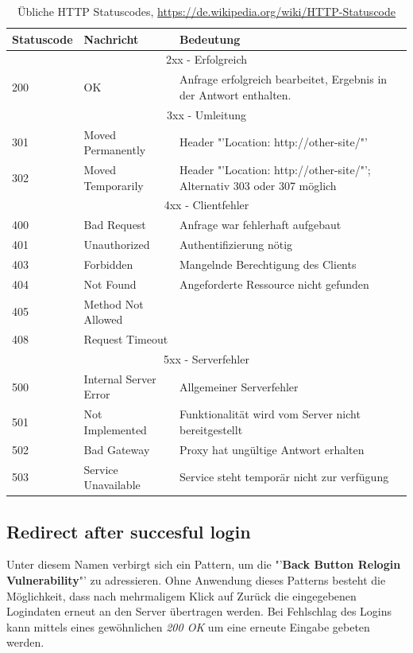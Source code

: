 \begin{table}[H]
	\begin{tabularx}{\textwidth}{l|p{100pt}|X}
		\textbf{Statuscode} & \textbf{Nachricht} & \textbf{Bedeutung}\\ \hline
		\multicolumn{3}{c}{2xx - Erfolgreich} \\ \hline
		200 & OK & Anfrage erfolgreich bearbeitet, Ergebnis in der Antwort enthalten. \\ \hline
		\multicolumn{3}{c}{3xx - Umleitung} \\ \hline
		301 & Moved Permanently & Header "'Location: http://other-site/"' \\ \hline
		302 & Moved Temporarily & Header "'Location: http://other-site/"'; Alternativ 303 oder 307 möglich \\ \hline
		\multicolumn{3}{c}{4xx - Clientfehler} \\ \hline
		400 & Bad Request & Anfrage war fehlerhaft aufgebaut \\ \hline
		401 & Unauthorized & Authentifizierung nötig \\ \hline
		403 & Forbidden & Mangelnde Berechtigung des Clients \\ \hline
		404 & Not Found & Angeforderte Ressource nicht gefunden \\ \hline
		405 & Method Not Allowed & \\ \hline
		408 & Request Timeout & \\ \hline
		\multicolumn{3}{c}{5xx - Serverfehler} \\ \hline
		500 & Internal Server Error & Allgemeiner Serverfehler \\ \hline
		501 & Not Implemented & Funktionalität wird vom Server nicht bereitgestellt \\ \hline
		502 & Bad Gateway & Proxy hat ungültige Antwort erhalten \\ \hline
		503 & Service Unavailable & Service steht temporär nicht zur verfügung \\ \hline
	\end{tabularx}
	\caption{Übliche HTTP Statuscodes, \url{https://de.wikipedia.org/wiki/HTTP-Statuscode}}
\end{table}

\subsection{Redirect after succesful login}
Unter diesem Namen verbirgt sich ein Pattern, um die "'\textbf{Back Button Relogin Vulnerability}"' zu adressieren. Ohne Anwendung dieses Patterns besteht die Möglichkeit, dass nach mehrmaligem Klick auf Zurück die eingegebenen Logindaten erneut an den Server übertragen werden. Bei Fehlschlag des Logins kann mittels eines gewöhnlichen \textit{200 OK} um eine erneute Eingabe gebeten werden.

